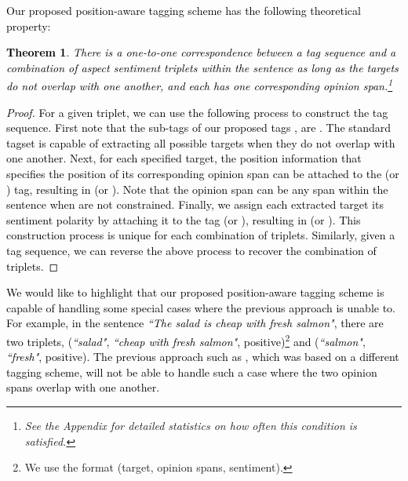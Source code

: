 \documentclass[11pt,a4paper]{article}
\newtheorem{theorem}{Theorem}[section]
\begin{document}
\textcolor{black}{
Our proposed position-aware tagging scheme has the following theoretical property:
\begin{theorem} There is a one-to-one correspondence between a tag sequence and a combination of aspect sentiment triplets within the sentence as long as the targets do not overlap with one another, and each has one corresponding opinion span.\footnote{See the Appendix for detailed statistics on how often this condition is satisfied.}
\end{theorem} 
\begin{proof}
For a given triplet, we can use the following process to construct the tag sequence.
    First note that the sub-tags of our proposed tags , are . The standard  tagset is capable of extracting all possible targets when they do not overlap with one another. 
    Next, for each specified target, the position information  that specifies the position of its corresponding opinion span can be attached to the  (or ) tag, resulting in  (or ). Note that the opinion span can be any span within the sentence when  are not constrained. Finally, we assign each extracted target its sentiment polarity  by attaching it to the tag  (or ), resulting in  (or ). This construction process is unique for each combination of triplets. Similarly, given a tag sequence, we can reverse the above process to recover the combination of triplets.
\end{proof}
We would like to highlight that our proposed position-aware tagging scheme is capable of handling some special cases where the previous approach is unable to. For example, in the sentence \textit{``The salad is cheap with fresh salmon"}, there are two triplets, (\textit{``salad"}, \textit{``cheap with fresh salmon"}, positive)\footnote{We use the format (target, opinion spans, sentiment).} and (\textit{``salmon"}, \textit{``fresh"}, positive). The previous approach such as \cite{peng2019knowing}, which was based on a different tagging scheme, will not be able to handle such a case where the two opinion spans overlap with one another.}
\end{document}
